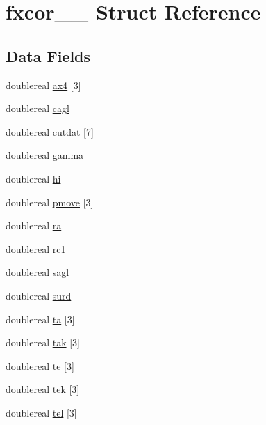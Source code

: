 \hypertarget{structfxcor__1__}{}\section{fxcor\+\_\+\_\+ Struct Reference}
\label{structfxcor__1__}
\subsection*{Data Fields}
\begin{DoxyCompactItemize}
\item 
doublereal \hyperlink{structfxcor__1___ae0c7825286b71aa462d610edfc95371d}{ax4} \mbox{[}3\mbox{]}
\item 
doublereal \hyperlink{structfxcor__1___aff52d4af2a4494e3bf16b35cf876797f}{cagl}
\item 
doublereal \hyperlink{structfxcor__1___a1f7f6fa2eb591e8374ae2d33348c182a}{cutdat} \mbox{[}7\mbox{]}
\item 
doublereal \hyperlink{structfxcor__1___ad97ee657cb98f2344103d8541ca06669}{gamma}
\item 
doublereal \hyperlink{structfxcor__1___a501f06f64dd42d14c52a160780b8840f}{hi}
\item 
doublereal \hyperlink{structfxcor__1___a6aeeee56deebedb279a4c347c18445d4}{pmove} \mbox{[}3\mbox{]}
\item 
doublereal \hyperlink{structfxcor__1___aad8a836801c5c25cffee45a3f75e00f9}{ra}
\item 
doublereal \hyperlink{structfxcor__1___a956da884deb454126eceaf8b4c904767}{rc1}
\item 
doublereal \hyperlink{structfxcor__1___ae505051937663fdfeb4f4852c1deca81}{sagl}
\item 
doublereal \hyperlink{structfxcor__1___afc250ed2c82b0d1f17502736a3c9c0ac}{surd}
\item 
doublereal \hyperlink{structfxcor__1___ac47ddb305386955f88ea14fb7672c783}{ta} \mbox{[}3\mbox{]}
\item 
doublereal \hyperlink{structfxcor__1___a6c746139d56c895a094ced0f3d30bac0}{tak} \mbox{[}3\mbox{]}
\item 
doublereal \hyperlink{structfxcor__1___a54dcf6a6bd15ef6d197690b9ca457bad}{te} \mbox{[}3\mbox{]}
\item 
doublereal \hyperlink{structfxcor__1___a88ef825748aad2b5604de31d2dc8fba6}{tek} \mbox{[}3\mbox{]}
\item 
doublereal \hyperlink{structfxcor__1___a0efc371454ee71d50a98d5e9493072dd}{tel} \mbox{[}3\mbox{]}

\end{DoxyCompactItemize}
